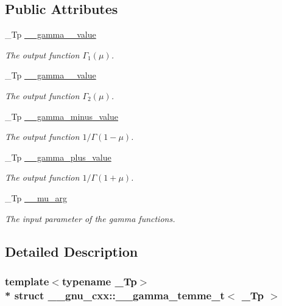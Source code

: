 \subsection*{Public Attributes}
\begin{DoxyCompactItemize}
\item 
\+\_\+\+Tp \hyperlink{struct____gnu__cxx_1_1____gamma__temme__t_a5cd3cdcf5479d232d3ea118c69198215}{\+\_\+\+\_\+gamma\+\_\+\_\+value}
\begin{DoxyCompactList}\small\item\em The output function $ \Gamma_1(\mu) $. \end{DoxyCompactList}\item 
\+\_\+\+Tp \hyperlink{struct____gnu__cxx_1_1____gamma__temme__t_af3113befce3b6bc9c561472fbaff4520}{\+\_\+\+\_\+gamma\+\_\+\_\+value}
\begin{DoxyCompactList}\small\item\em The output function $ \Gamma_2(\mu) $. \end{DoxyCompactList}\item 
\+\_\+\+Tp \hyperlink{struct____gnu__cxx_1_1____gamma__temme__t_afc5c8fbbc48bdb065bc425e53605dc3c}{\+\_\+\+\_\+gamma\+\_\+minus\+\_\+value}
\begin{DoxyCompactList}\small\item\em The output function $ 1/\Gamma(1 - \mu) $. \end{DoxyCompactList}\item 
\+\_\+\+Tp \hyperlink{struct____gnu__cxx_1_1____gamma__temme__t_a5484bd46240c8348c2d1f0718a056665}{\+\_\+\+\_\+gamma\+\_\+plus\+\_\+value}
\begin{DoxyCompactList}\small\item\em The output function $ 1/\Gamma(1 + \mu) $. \end{DoxyCompactList}\item 
\+\_\+\+Tp \hyperlink{struct____gnu__cxx_1_1____gamma__temme__t_a841e7c549dd505de260018ddaa020565}{\+\_\+\+\_\+mu\+\_\+arg}
\begin{DoxyCompactList}\small\item\em The input parameter of the gamma functions. \end{DoxyCompactList}\end{DoxyCompactItemize}


\subsection{Detailed Description}
\subsubsection*{template$<$typename \+\_\+\+Tp$>$\\*
struct \+\_\+\+\_\+gnu\+\_\+cxx\+::\+\_\+\+\_\+gamma\+\_\+temme\+\_\+t$<$ \+\_\+\+Tp $>$}

